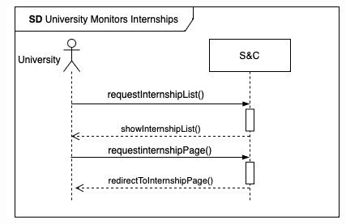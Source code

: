 \begin{enumerate}[label=\textbf{[US\arabic*]}, left = 0pt, align = left, resume]
\begin{longtable}{|l|p{11cm}|}
            \end{longtable}
            
            \begin{figure}[h!]
                \centering        \includegraphics{RASD/Images/UseCases/UniversityMonitorsInternships.drawio.png}
                \label{fig:example}
                \end{figure}
            
                
                
                
                

\end{enumerate}
